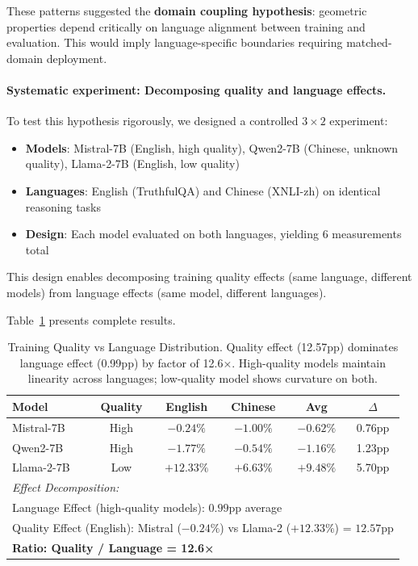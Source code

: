 \documentclass[11pt]{article}
\begin{document}
These patterns suggested the \textbf{domain coupling hypothesis}: geometric properties depend critically on language alignment between training and evaluation. This would imply language-specific boundaries requiring matched-domain deployment.

\paragraph{Systematic experiment: Decomposing quality and language effects.}
To test this hypothesis rigorously, we designed a controlled $3 \times 2$ experiment:
\begin{itemize}
\item \textbf{Models}: Mistral-7B (English, high quality), Qwen2-7B (Chinese, unknown quality), Llama-2-7B (English, low quality)
\item \textbf{Languages}: English (TruthfulQA) and Chinese (XNLI-zh) on identical reasoning tasks
\item \textbf{Design}: Each model evaluated on both languages, yielding 6 measurements total
\end{itemize}

This design enables decomposing training quality effects (same language, different models) from language effects (same model, different languages).

Table~\ref{tab:quality_language} presents complete results.

\begin{table}[h]
\centering
\caption{Training Quality vs Language Distribution. Quality effect (12.57pp) dominates language effect (0.99pp) by factor of 12.6×. High-quality models maintain linearity across languages; low-quality model shows curvature on both.}
\label{tab:quality_language}
\begin{tabular}{lccccc}
\toprule
\textbf{Model} & \textbf{Quality} & \textbf{English} & \textbf{Chinese} & \textbf{Avg} & \textbf{$\Delta$} \\
\midrule
Mistral-7B & High & $-0.24\%$ & $-1.00\%$ & $-0.62\%$ & 0.76pp \\
Qwen2-7B & High & $-1.77\%$ & $-0.54\%$ & $-1.16\%$ & 1.23pp \\
Llama-2-7B & Low & $+12.33\%$ & $+6.63\%$ & $+9.48\%$ & 5.70pp \\
\midrule
\multicolumn{6}{l}{\textit{Effect Decomposition:}} \\
\multicolumn{6}{l}{Language Effect (high-quality models): $0.99$pp average} \\
\multicolumn{6}{l}{Quality Effect (English): Mistral ($-0.24\%$) vs Llama-2 ($+12.33\%$) = $12.57$pp} \\
\multicolumn{6}{l}{\textbf{Ratio: Quality / Language = 12.6×}} \\
\bottomrule
\end{tabular}
\end{table}
\end{document}
